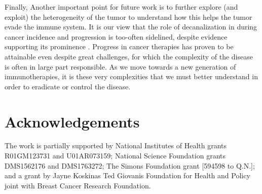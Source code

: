 \documentclass[11pt]{article}
\begin{document}
\par
Finally, Another important point for future work is to further explore (and exploit) the heterogeneity of the tumor to understand how this helps the tumor evade the immune system. It is our view that the role of decanalization \cite{gibson09_decanalization} in during cancer incidence and progression is too-often sidelined, despite evidence supporting its prominence \cite{cyll17_tumour}. Progress in cancer therapies has proven to be attainable even despite great challenges, for which the complexity of the disease is often in large part responsible. As we move towards a new generation of immunotherapies, it is these very complexities that we must better understand in order to eradicate or control the disease. 



\section*{Acknowledgements}
The work is partially supported by National Institutes of Health grants R01GM123731 and U01AR073159; National Science Foundation grants DMS1562176 and DMS1763272; The Simons Foundation grant [594598 to Q.N.]; and a grant by Jayne Koskinas Ted Giovanis Foundation for Health and Policy joint with Breast Cancer Research Foundation.




\end{document}
